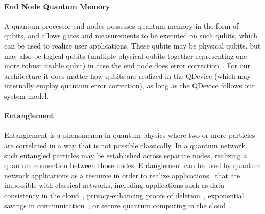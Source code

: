 \paragraph{End Node Quantum Memory}

A quantum processor end nodes possesses quantum memory in the form of qubits, and allows gates and measurements to be executed on such qubits, which can be used to realize user applications. These qubits may be physical qubits, but may also be logical qubits (multiple physical qubits together representing one more robust usable qubit) in case the end node does error correction~\cite{lidar2013quantum}. For our architecture it does matter how qubits are realized in the QDevice (which may internally employ quantum error correction), as long as the QDevice follows our system model.

\paragraph{Entanglement}

Entanglement is a phenomenon in quantum physics where two or more particles are correlated in a way that is not possible classically. In a quantum network, such entangled particles may be established across separate nodes, realizing a quantum connection between those nodes. Entanglement can be used by quantum network applications as a resource in order to realize applications~\cite{wehner_2018_stages} that are impossible with classical networks, including applications such as data consistency in the cloud~\cite{benor_2005_byzantine}, privacy-enhancing proofs of deletion~\cite{poremba_quantum_2022}, exponential savings in communication~\cite{guerin_exponential_2016}, or secure quantum computing in the cloud~\cite{broadbent_2009_ubqc,childs_2005_secure_qc}.


